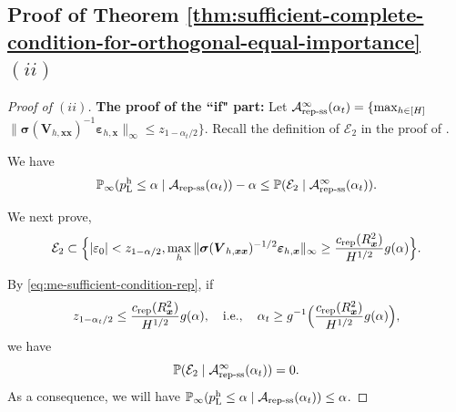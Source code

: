 \documentclass[12pt]{article}
\newcommand{\Prob}{\mathbb{P}}
\newcommand{\repss}{\textnormal{rep-ss}}
\newcommand{\rep}{\textnormal{rep}}
\newcommand{\bs}{\boldsymbol}
\newcommand{\hpL}{p_\textnormal{L}^{\textnormal{h}}}
\begin{document}
\subsection{Proof of Theorem \ref{thm:sufficient-complete-condition-for-orthogonal-equal-importance} $(ii)$}
\begin{proof}[Proof of  $(ii)$]
\noindent \textbf{The proof of the ``if" part:}
    Let $\mathcal{A}_{\repss}^{\infty}(\alpha_t) = \{\max_{h\in [H]}$ $ \|\bs{\sigma}(\bs{V}_{h,\bs{x}\bs{x}})^{-1}\bs{\varepsilon}_{h,\bs{x}}\|_\infty\leq z_{1-\alpha_t/2}\}$. Recall the definition of $\mathcal{E}_2$ in the proof of .

We have
\begin{align*}
\Prob_{\infty}(\hpL \leq \alpha \mid \mathcal{A}_{\repss}(\alpha_t))-\alpha \leq \Prob(\mathcal{E}_2\mid\mathcal{A}_{\repss}^{\infty}(\alpha_t)).
\end{align*}


We next prove, 
\begin{align}
\label{eq:me-sufficient-condition-rep}
\mathcal{E}_2  \subset \Big\{|\varepsilon_0| < z_{1-\alpha/2},\max_h \|\bs{\sigma}(\bs{V}_{h,\bs{x}\bs{x}})^{-1/2}\bs{\varepsilon}_{h,\bs{x}}\|_\infty \geq \frac{c_{\rep}(R_{\bs{x}}^2)}{H^{1/2}}g(\alpha)\Big\}.  
\end{align}

By \eqref{eq:me-sufficient-condition-rep}, if
\[
z_{1-\alpha_t/2} \leq \frac{c_{\rep}(R_{\bs{x}}^2)}{H^{1/2}}g(\alpha), \quad \text{i.e.},\quad \alpha_t \geq g^{-1}\Big(\frac{c_{\rep}(R_{\bs{x}}^2)}{H^{1/2}}g(\alpha)\Big), 
\]
we have
\[
\Prob(\mathcal{E}_2\mid\mathcal{A}_{\repss}^{\infty}(\alpha_t)) = 0.
\]
As a consequence, we will have $\Prob_{\infty}(\hpL \leq \alpha \mid \mathcal{A}_{\repss}(\alpha_t)) \leq \alpha$.


\end{proof}
\end{document}
